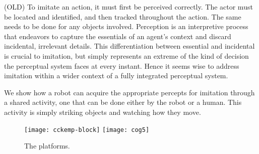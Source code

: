 



\ifnote

(OLD) To imitate an action, it must first be perceived correctly.  
%
The actor must be located and identified, and then tracked 
throughout the action.  The same needs to be done for
any objects involved.
%
Perception is an interpretive process that endeavors to
capture the essentials of an agent's context and
discard incidental, irrelevant details.
%
This differentiation between essential and incidental
is crucial to imitation, but simply represents an 
extreme of the kind of decision the perceptual system
faces at every instant.  Hence it seems wise to address
imitation within a wider context of a fully integrated 
perceptual system.

%
%
%

We show how a robot can acquire the appropriate percepts for imitation
through a shared activity, one that can be done either by the robot or
a human.  This activity is simply striking objects and watching how
they move.

\fi


\begin{figure}[tb]
\centerline{
\texttt{[image: cckemp-block]}
\texttt{[image: cog5]}}
\caption[Another example]{ 
%
%
The platforms.
%
}
\end{figure}

